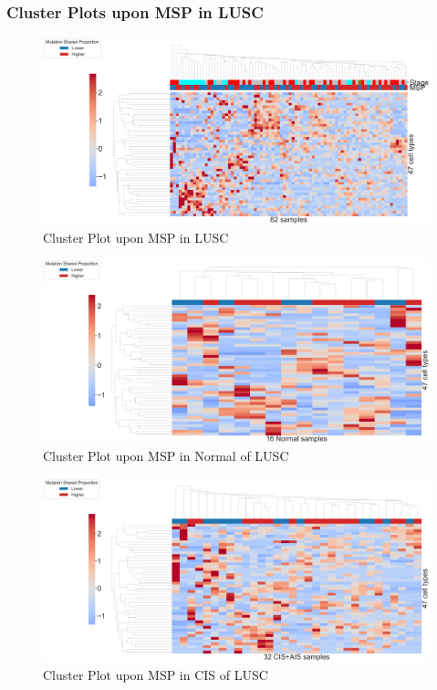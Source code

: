 \documentclass{beamer}
\begin{document}
    \begin{frame}[allowframebreaks]
        \frametitle{Cluster Plots upon MSP in LUSC}

        \begin{figure}
            \includegraphics[width=0.9 \linewidth]{figures/BisqueRNA/clustermap/STAR.FPKM.GSE131907.SQC.MSP-median/Mutation Shared Proportion-All.pdf}
            \caption{Cluster Plot upon MSP in LUSC}
        \end{figure}

        \begin{figure}
            \includegraphics[width=0.9 \linewidth]{figures/BisqueRNA/clustermap/STAR.FPKM.GSE131907.SQC.MSP-median/Mutation Shared Proportion-Normal.pdf}
            \caption{Cluster Plot upon MSP in Normal of LUSC}
        \end{figure}

        \begin{figure}
            \includegraphics[width=0.9 \linewidth]{figures/BisqueRNA/clustermap/STAR.FPKM.GSE131907.SQC.MSP-median/Mutation Shared Proportion-CIS+AIS.pdf}
            \caption{Cluster Plot upon MSP in CIS of LUSC}
        \end{figure}


\end{frame}
\end{document}
